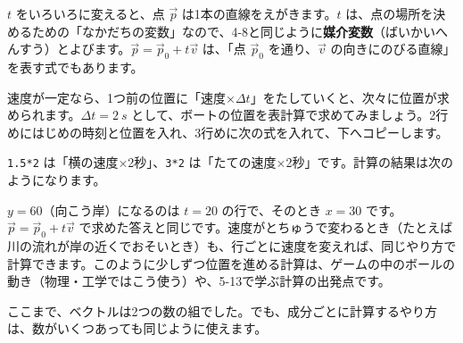 $t$ をいろいろに変えると、点 $\vec{p}$ は1本の直線をえがきます。$t$ は、点の場所を決めるための「なかだちの変数」なので、4-8と同じように\textbf{媒介変数}（ばいかいへんすう）とよびます。$\vec{p}=\vec{p}_0+t\vec{v}$ は、「点 $\vec{p}_0$ を通り、$\vec{v}$ の向きにのびる直線」を表す式でもあります。

速度が一定なら、1つ前の位置に「速度×$\Delta t$」をたしていくと、次々に位置が求められます。$\Delta t=\qty{2}{s}$ として、ボートの位置を表計算で求めてみましょう。2行めにはじめの時刻と位置を入れ、3行めに次の式を入れて、下へコピーします。
\begin{bkcenter}
\end{bkcenter}
\texttt{1.5*2} は「横の速度×2秒」、\texttt{3*2} は「たての速度×2秒」です。計算の結果は次のようになります。
\begin{bkcenter}
\end{bkcenter}
$y=60$（向こう岸）になるのは $t=20$ の行で、そのとき $x=30$ です。$\vec{p}=\vec{p}_0+t\vec{v}$ で求めた答えと同じです。速度がとちゅうで変わるとき（たとえば川の流れが岸の近くでおそいとき）も、行ごとに速度を変えれば、同じやり方で計算できます。このように少しずつ位置を進める計算は、ゲームの中のボールの動き（物理・工学ではこう使う）や、5-13で学ぶ計算の出発点です。


\label{bk:4-11:kumi}ここまで、ベクトルは2つの数の組でした。でも、成分ごとに計算するやり方は、数がいくつあっても同じように使えます。

